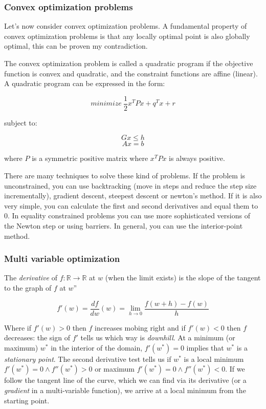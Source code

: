 \documentclass{article}
\begin{document}
\subsubsection{Convex optimization
problems}\label{convex-optimization-problems}

Let's now consider convex optimization problems. A fundamental property
of convex optimization problems is that any locally optimal point is
also globally optimal, this can be proven my contradiction.

The convex optimization problem is called a quadratic program if the
objective function is convex and quadratic, and the constraint functions
are affine (linear). A quadratic program can be expressed in the form:

\[minimize\ \frac{1}{2}x^TPx + q^Tx+r\]

subject to:

\[Gx \le h\] \[Ax=b\]

where \(P\) is a symmetric positive matrix where \(x^TPx\) is always
positive.

There are many techniques to solve these kind of problems. If the
problem is unconstrained, you can use backtracking (move in steps and
reduce the step size incrementally), gradient descent, steepest descent
or newton's method. If it is also very simple, you can calculate the
first and second derivatives and equal them to 0. In equality
constrained problems you can use more sophisticated versions of the
Newton step or using barriers. In general, you can use the
interior-point method.

\subsubsection{Multi variable
optimization}\label{multi-variable-optimization}

The \emph{derivative} of \(f: \mathbb{R} \rightarrow \mathbb{R}\) at
\(w\) (when the limit exists) is the slope of the tangent to the graph
of \(f\) at \(w\)''

\[f'(w) = \frac{df}{dw}(w) = \lim_{h\rightarrow 0} \frac{f(w+h) - f(w)}{h}\]

Where if \(f'(w) > 0\) then \(f\) increases mobing right and if
\(f'(w) < 0\) then \(f\) decreases: the sign of \(f'\) tells us which
way is \emph{downhill}. At a minimum (or maximum) \(w^*\) in the
interior of the domain, \(f'(w^*) = 0\) implies that \(w^*\) is a
\emph{stationary point}. The second derivative test tells us if \(w^*\)
is a local minimum \(f'(w^*) = 0 \land f''(w^*) > 0\) or maximum
\(f'(w^*) = 0 \land f''(w^*)
< 0\). If we follow the tangent line of the curve, which we can find via
its derivative (or a \emph{gradient} in a multi-variable function), we
arrive at a local minimum from the starting point.
\end{document}
